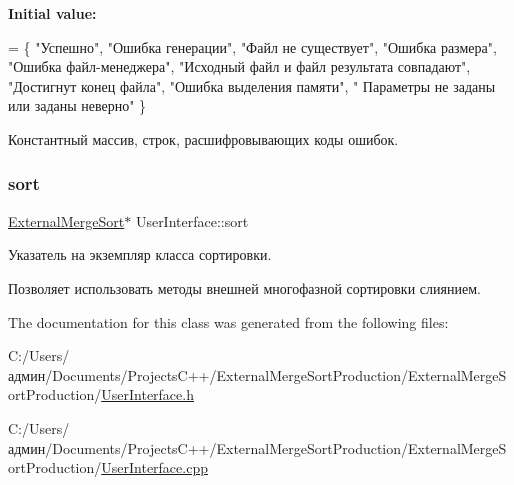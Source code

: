 {\bfseries Initial value\+:}
\begin{DoxyCode}
= \{ \textcolor{stringliteral}{"Успешно"}, \textcolor{stringliteral}{"Ошибка генерации"}, \textcolor{stringliteral}{"Файл не существует"}, \textcolor{stringliteral}{"Ошибка размера"}, \textcolor{stringliteral}{"Ошибка файл-менеджера"},
        \textcolor{stringliteral}{"Исходный файл и файл результата совпадают"}, \textcolor{stringliteral}{"Достигнут конец файла"}, \textcolor{stringliteral}{"Ошибка выделения памяти"}, \textcolor{stringliteral}{"
      Параметры не заданы или заданы неверно"} \}
\end{DoxyCode}


Константный массив, строк, расшифровывающих коды ошибок. 

\hypertarget{class_user_interface_af3405ffdb7e2834c2cf63662b5415a91}{}\label{class_user_interface_af3405ffdb7e2834c2cf63662b5415a91} 
\subsubsection{\texorpdfstring{sort}{sort}}
{\footnotesize\ttfamily \hyperlink{class_external_merge_sort}{External\+Merge\+Sort}$\ast$ User\+Interface\+::sort\hspace{0.3cm}{\ttfamily [private]}}



Указатель на экземпляр класса сортировки. 

Позволяет использовать методы внешней многофазной сортировки слиянием. 

The documentation for this class was generated from the following files\+:\begin{DoxyCompactItemize}
\item 
C\+:/\+Users/админ/\+Documents/\+Projects\+C++/\+External\+Merge\+Sort\+Production/\+External\+Merge\+Sort\+Production/\hyperlink{_user_interface_8h}{User\+Interface.\+h}\item 
C\+:/\+Users/админ/\+Documents/\+Projects\+C++/\+External\+Merge\+Sort\+Production/\+External\+Merge\+Sort\+Production/\hyperlink{_user_interface_8cpp}{User\+Interface.\+cpp}\end{DoxyCompactItemize}
